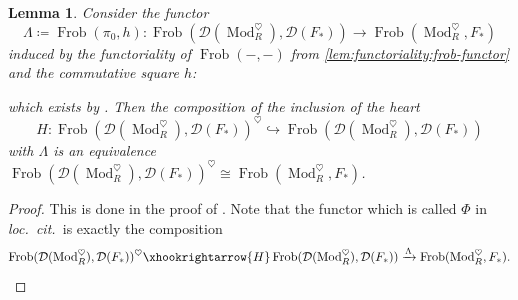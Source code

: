 \documentclass{article}
\theoremstyle{definition}
\theoremstyle{definition}
\theoremstyle{definition}
\theoremstyle{plain}
\newtheorem{lem}[defn]{Lemma}
\theoremstyle{plain}
\theoremstyle{plain}
\theoremstyle{plain}
\theoremstyle{plain}
\theoremstyle{plain}
\theoremstyle{plain}
\theoremstyle{plain}
\theoremstyle{remark}
\theoremstyle{remark}
\theoremstyle{plain}
\theoremstyle{plain}
\theoremstyle{plain}
\theoremstyle{plain}
\theoremstyle{plain}
\newcommand{\ModDisc}[1]{\operatorname{Mod}_{#1}^{\heartsuit}}
\newcommand{\Frob}[2]{\operatorname{Frob}(#1, #2)}
\newcommand{\Cat}[1]{\mathcal{#1}}
\newcommand{\loccit}{\textit{loc.~cit.~}}
\begin{document}
\begin{lem} \label{lem:affine:heart-identification}
    Consider the functor 
    \begin{equation*}
        \Lambda \coloneqq \Frob{\pi_0}{h} \colon \Frob{\Cat D(\ModDisc{R})}{\Cat D(F_*)} \to \Frob{\ModDisc{R}}{F_*}
    \end{equation*}
    induced by the functoriality of $\Frob{-}{-}$ from \cref{lem:functoriality:frob-functor} and the commutative square $h$:
    \begin{center}
    \end{center}
    which exists by \cite[Lemma A.4]{cartmod}.
    Then the composition of the inclusion of the heart 
    \begin{equation*}
        H \colon \Frob{\Cat D(\ModDisc{R})}{\Cat D(F_*)}^\heartsuit \hookrightarrow \Frob{\Cat D(\ModDisc{R})}{\Cat D(F_*)}
    \end{equation*}
    with $\Lambda$ 
    is an equivalence $\Frob{\Cat D(\ModDisc{R})}{\Cat D(F_*)}^\heartsuit \cong \Frob{\ModDisc{R}}{F_*}$.
\end{lem}
\begin{proof}
    This is done in the proof of \cite[Proposition 3.4]{cartmod}. Note that the functor which is called $\Phi$ in \loccit is exactly the composition
    \begin{equation*}
        \Frob{\Cat D(\ModDisc{R})}{\Cat D(F_*)}^\heartsuit \xhookrightarrow{H} \Frob{\Cat D(\ModDisc{R})}{\Cat D(F_*)} \xrightarrow{\Lambda} \Frob{\ModDisc{R}}{F_*}. \qedhere
    \end{equation*}
\end{proof}
\end{document}
